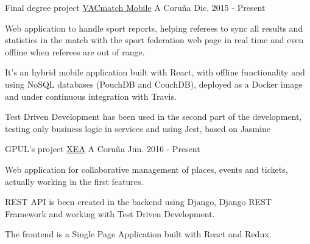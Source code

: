 


\begin{cventries}


\cventry
{Final degree project} %
{\href{https://github.com/vacmatch/vacmatch-mobile}{VACmatch Mobile}} %
{A Coruña} %
{Dic. 2015 - Present} %
{ %
\begin{cvitems}
\item {Web application to handle sport reports, helping referees to sync all 
results and statistics in the match with the sport federation web page in 
real time and even offline when referees are out of range.}
\item {It's an hybrid mobile application built with React, with offline 
functionality and using NoSQL databases (PouchDB and CouchDB), deployed as a 
Docker image and under continuous integration with Travis.}
\item {Test Driven Development has been used in the second part of the 
development, testing only business logic in services and using Jest, based 
on Jasmine}
\end{cvitems}
}

\cventry
{GPUL's project} %
{\href{https://github.com/gpul-org/XEA}{XEA}} %
{A Coruña} %
{Jun. 2016 - Present} %
{ %
\begin{cvitems}
\item {Web application for collaborative management of places, events 
and tickets, actually working in the first features.}
\item {REST API is been created in the backend using Django, Django 
REST Framework and working with Test Driven Development.}
\item {The frontend is a Single Page Application built with React and Redux.}
\end{cvitems}
}


\end{cventries}